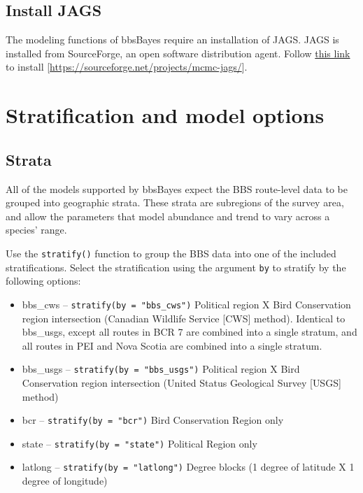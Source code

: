 \documentclass[
]{book}
\begin{document}
\hypertarget{install-jags}{%
\section{Install JAGS}\label{install-jags}}

The modeling functions of bbsBayes require an installation of JAGS. JAGS is installed from SourceForge, an open software distribution agent. Follow \href{https://sourceforge.net/projects/mcmc-jags/}{this link} to install {[}\url{https://sourceforge.net/projects/mcmc-jags/}{]}.

\hypertarget{Stratify}{%
\chapter{Stratification and model options}\label{Stratify}}

\hypertarget{strata}{%
\section{Strata}\label{strata}}

All of the models supported by bbsBayes expect the BBS route-level data to be grouped into geographic strata. These strata are subregions of the survey area, and allow the parameters that model abundance and trend to vary across a species' range.

Use the \texttt{stratify()} function to group the BBS data into one of the included stratifications. Select the stratification using the argument \texttt{by} to stratify by the following options:

\begin{itemize}
\item
  bbs\_cws -- \texttt{stratify(by\ =\ "bbs\_cws")} Political region X Bird Conservation region intersection (Canadian Wildlife Service {[}CWS{]} method). Identical to bbs\_usgs, except all routes in BCR 7 are combined into a single stratum, and all routes in PEI and Nova Scotia are combined into a single stratum.
\item
  bbs\_usgs -- \texttt{stratify(by\ =\ "bbs\_usgs")} Political region X Bird Conservation region intersection (United Status Geological Survey {[}USGS{]} method)
\item
  bcr -- \texttt{stratify(by\ =\ "bcr")} Bird Conservation Region only
\item
  state -- \texttt{stratify(by\ =\ "state")} Political Region only
\item
  latlong -- \texttt{stratify(by\ =\ "latlong")} Degree blocks (1 degree of latitude X 1 degree of longitude)
\end{itemize}
\end{document}
